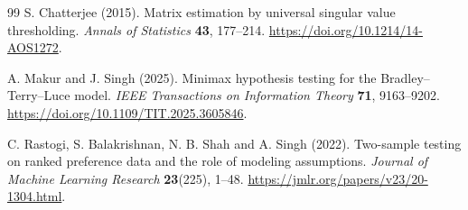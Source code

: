 \documentclass[11pt,a4paper]{article}
\theoremstyle{definition}
\begin{document}
\begin{thebibliography}{99}
 S. Chatterjee (2015).
Matrix estimation by universal singular value thresholding.
\emph{Annals of Statistics} \textbf{43}, 177--214.
\url{https://doi.org/10.1214/14-AOS1272}.

 A. Makur and J. Singh (2025).
Minimax hypothesis testing for the Bradley--Terry--Luce model.
\emph{IEEE Transactions on Information Theory} \textbf{71}, 9163--9202.
\url{https://doi.org/10.1109/TIT.2025.3605846}.

 C. Rastogi, S. Balakrishnan, N. B. Shah and A. Singh (2022).
Two-sample testing on ranked preference data and the role of modeling assumptions.
\emph{Journal of Machine Learning Research} \textbf{23}(225), 1--48.
\url{https://jmlr.org/papers/v23/20-1304.html}.
\end{thebibliography}
\end{document}
